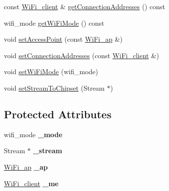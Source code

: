 \begin{DoxyCompactItemize}
const \mbox{\hyperlink{structathome_1_1communication_1_1wifi_1_1s__wifi__client}{Wi\+Fi\+\_\+client}} \& \mbox{\hyperlink{classathome_1_1communication_1_1wifi_1_1_a_wi_fi_communicator_afcc41f462a12c8348148c915dcafd1a0}{get\+Connection\+Addresses}} () const
\item 
wifi\+\_\+mode \mbox{\hyperlink{classathome_1_1communication_1_1wifi_1_1_a_wi_fi_communicator_adebc335ea6408a90919f396f06260b13}{get\+Wi\+Fi\+Mode}} () const
\item 
void \mbox{\hyperlink{classathome_1_1communication_1_1wifi_1_1_a_wi_fi_communicator_a2b802d934022436e029fc31b3e84d321}{set\+Access\+Point}} (const \mbox{\hyperlink{structathome_1_1communication_1_1wifi_1_1s__wifi__access__point}{Wi\+Fi\+\_\+ap}} \&)
\item 
void \mbox{\hyperlink{classathome_1_1communication_1_1wifi_1_1_a_wi_fi_communicator_a31fb91672f298718d99bb9776dfe46c9}{set\+Connection\+Addresses}} (const \mbox{\hyperlink{structathome_1_1communication_1_1wifi_1_1s__wifi__client}{Wi\+Fi\+\_\+client}} \&)
\item 
void \mbox{\hyperlink{classathome_1_1communication_1_1wifi_1_1_a_wi_fi_communicator_a28538cf510da8b59056b2533a6e53bcc}{set\+Wi\+Fi\+Mode}} (wifi\+\_\+mode)
\item 
void \mbox{\hyperlink{classathome_1_1communication_1_1wifi_1_1_a_wi_fi_communicator_a42f2ad88713db57bd9e9670f090924de}{set\+Stream\+To\+Chipset}} (Stream $\ast$)
\end{DoxyCompactItemize}
\subsection*{Protected Attributes}
\begin{DoxyCompactItemize}
\item 
\mbox{\label{classathome_1_1communication_1_1wifi_1_1_a_wi_fi_communicator_a857f4193bdf63fcfdddeaf43f945ed50}} 
wifi\+\_\+mode {\bfseries \+\_\+mode}
\item 
\mbox{\label{classathome_1_1communication_1_1wifi_1_1_a_wi_fi_communicator_a07a54c2f10295708f14d6a9069612f48}} 
Stream $\ast$ {\bfseries \+\_\+stream}
\item 
\mbox{\label{classathome_1_1communication_1_1wifi_1_1_a_wi_fi_communicator_a4d1d5dae7e80603205321585a8861bb8}} 
\mbox{\hyperlink{structathome_1_1communication_1_1wifi_1_1s__wifi__access__point}{Wi\+Fi\+\_\+ap}} {\bfseries \+\_\+ap}
\item 
\mbox{\label{classathome_1_1communication_1_1wifi_1_1_a_wi_fi_communicator_af249e6e9eff32fed22de39a5b7c62b49}} 
\mbox{\hyperlink{structathome_1_1communication_1_1wifi_1_1s__wifi__client}{Wi\+Fi\+\_\+client}} {\bfseries \+\_\+me}
\end{DoxyCompactItemize}


